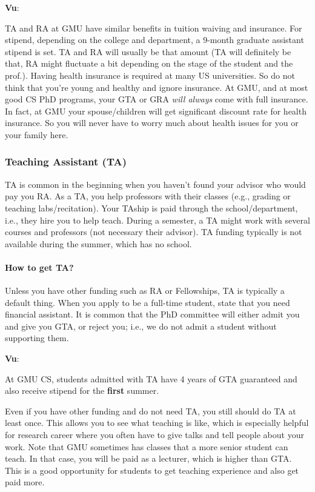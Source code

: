 \documentclass[11pt]{article}
\newenvironment{commentbox}[1][]{
\small
    \begin{cbox}
    \textbf{#1}: 
 }{
   \end{cbox}
}
\begin{document}
\begin{commentbox}[Vu]
TA and RA at GMU have similar benefits in tuition waiving and insurance.  For stipend, depending on the college and department, a 9-month graduate assistant stipend is set.  TA and RA will usually be that amount (TA will definitely be that, RA might fluctuate a bit depending on the stage of the student and the prof.). 
\tcblower
Having health insurance is required at many US universities.  So do not think that you're young and healthy and ignore insurance.  At GMU, and at most good CS PhD programs, your GTA or GRA \emph{will always} come with full insurance. In fact, at GMU your spouse/children will get significant discount rate for health insurance.  So you will never have to worry much about health issues for you or your family here.
\end{commentbox}


\subsubsection{Teaching Assistant (TA)}

TA is common in the beginning when you haven't found your advisor who would pay you RA. As a TA, you help professors with their classes (e.g., grading or teaching labs/recitation). Your TAship is paid through the school/department, i.e., they hire you to help teach.  During a semester, a TA might work with several courses and professors (not necessary their advisor).  TA funding typically is not available during the summer, which has no school.

\paragraph{How to get TA?}  Unless you have other funding such as RA or Fellowships, TA is typically a default thing. When you apply to be a full-time student,  state that you need financial assistant. It is common that the PhD committee will either admit you and give you GTA, or reject you; i.e., we do not admit a student without supporting them.  

\begin{commentbox}[Vu]
At GMU CS, students admitted with TA have  4 years of GTA guaranteed and also receive  stipend for the \textbf{first} summer.
\end{commentbox}

Even if you have other funding and do not need TA, you still should do TA at least once.  This allows you to see what teaching is like, which is especially helpful for research career where you often have to give talks and tell people about your work. Note that GMU sometimes has classes that a more senior student can teach.  In that case, you will be paid as a lecturer, which is higher than GTA.  This is a good opportunity for students to get teaching experience and also get paid more.
\end{document}
